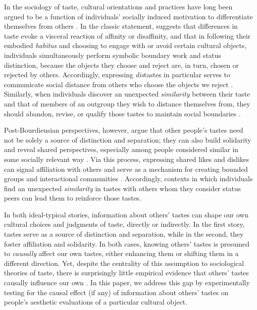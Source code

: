 \documentclass[12pt, letterpaper]{article}
\begin{document}
In the sociology of taste, cultural orientations and practices have long been argued to be a function of individuals' socially induced motivation to differentiate themselves from others \citep{simmel1957, dimaggio1987, lizardo2016cultural-aaa, pomiès2018retracing-dd8}. In the classic statement, \citet{bourdieu1984} suggests that differences in taste evoke a visceral reaction of affinity or disaffinity, and that in following their embodied \textit{habitus} and choosing to engage with or avoid certain cultural objects, individuals simultaneously perform symbolic boundary work and status distinction, because the objects they choose and reject are, in turn, chosen or rejected by others. Accordingly, expressing \textit{dis}tastes in particular serves to communicate social distance from others who choose the objects we reject \citep{bryson1996, lamont2002, lizardo2016cultural-aaa}. Similarly, when individuals discover an unexpected \textit{similarity} between their taste and that of members of an outgroup they wish to distance themselves from, they should abandon, revise, or qualify those tastes to maintain social boundaries \citep{berger2008, simmel1957}.

Post-Bourdieusian perspectives, however, argue that other people's tastes need not be solely a source of distinction and separation; they can also build solidarity and reveal shared perspectives, especially among people considered similar in some socially relevant way \citep{pomiès2018retracing-dd8}. Via this process, expressing shared likes and dislikes can signal affiliation with others and serve as a mechanism for creating bounded groups and interactional communities \citep{dimaggio1987, benzecry2014high-9bf, lizardo2006, vanzella2022tastes, wohl2015community-2d2}. Accordingly, contexts in which individuals find an unexpected \textit{similarity} in tastes with others whom they consider status peers can lead them to reinforce those tastes. 

In both ideal-typical stories, information about others' tastes can shape our own cultural choices and judgments of taste, directly or indirectly. In the first story, tastes serve as a source of distinction and separation, while in the second, they foster affiliation and solidarity. In both cases, knowing others' tastes is presumed to \textit{causally} affect our own tastes, either enhancing them or shifting them in a different direction. Yet, despite the centrality of this assumption to sociological theories of taste, there is surprisingly little empirical evidence that others' tastes causally influence our own \citep[but see][]{salganik2006experimental-88d}. In this paper, we address this gap by experimentally testing for the causal effect (if any) of information about others' tastes on people's aesthetic evaluations of a particular cultural object.
\end{document}
